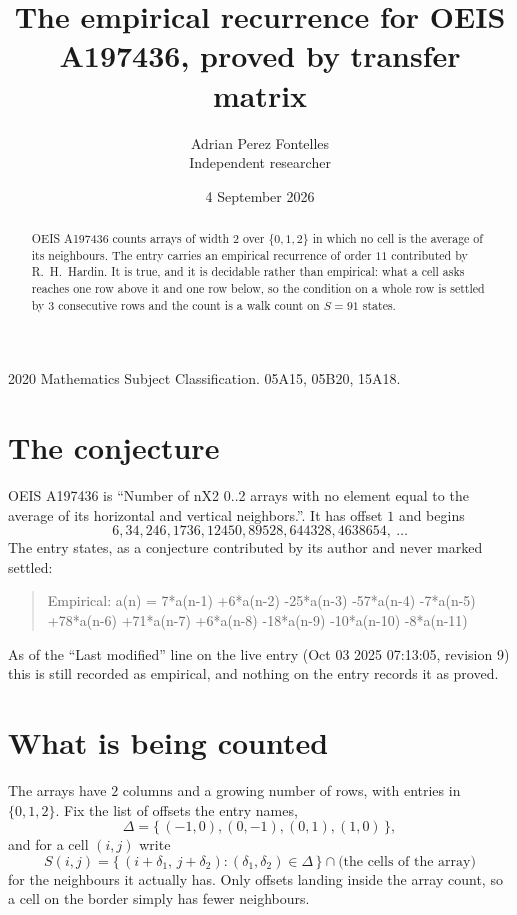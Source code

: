 \documentclass[11pt,a4paper]{article}
\title{The empirical recurrence for OEIS A197436, proved by transfer matrix}
\author{Adrian Perez Fontelles\\ \small Independent researcher}
\date{4 September 2026}
\theoremstyle{plain}
\theoremstyle{definition}
\begin{document}
\maketitle

\begin{abstract}
OEIS A197436 counts arrays of width $2$ over $\{0,1,2\}$ in which no cell is the average of its neighbours. The entry carries an
empirical recurrence of order $11$ contributed by R.~H.~Hardin. It is true, and it is
decidable rather than empirical: what a cell asks reaches one row above
it and one row below, so the condition on a whole row is settled by
$3$ consecutive rows and the count is a walk count on $S=91$ states.
\end{abstract}

\noindent\small 2020 Mathematics Subject Classification. 05A15, 05B20, 15A18.\normalsize

\section{The conjecture}

OEIS A197436 is ``Number of nX2 0..2 arrays with no element equal to the average of its horizontal and vertical neighbors.''. It has offset $1$ and begins
\[
6, 34, 246, 1736, 12450, 89528, 644328, 4638654,\ \dots
\]
The entry states, as a conjecture contributed by its author and never marked settled:
\begin{quote}
Empirical: a(n) = 7*a(n-1) +6*a(n-2) -25*a(n-3) -57*a(n-4) -7*a(n-5) +78*a(n-6) +71*a(n-7) +6*a(n-8) -18*a(n-9) -10*a(n-10) -8*a(n-11)
\end{quote}
As of the ``Last modified'' line on the live entry (Oct 03 2025 07:13:05, revision 9) this is still
recorded as empirical, and nothing on the entry records it as proved.

\section{What is being counted}

The arrays have $2$ columns and a growing number of rows, with entries in $\{0,1,2\}$. Fix the
list of offsets the entry names,
\[
\Delta=\{\,(-1,0), (0,-1), (0,1), (1,0)\,\},
\]
and for a cell $(i,j)$ write
\[
S(i,j)=\{\,(i+\delta_1,\,j+\delta_2) : (\delta_1,\delta_2)\in\Delta\,\}\cap
\text{(the cells of the array)}
\]
for the neighbours it actually has. Only offsets landing inside the array count, so a cell on
the border simply has fewer neighbours.
\end{document}
